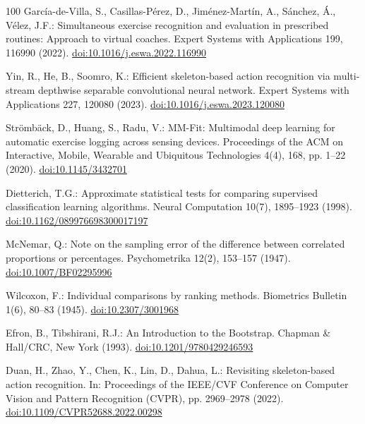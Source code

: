 \documentclass[runningheads]{llncs}
\begin{document}
\begin{thebibliography}{100}
Garc\'{i}a-de-Villa, S., Casillas-P\'{e}rez, D., Jim\'{e}nez-Mart\'{i}n, A., S\'{a}nchez, \'{A}., V\'{e}lez, J.F.: Simultaneous exercise recognition and evaluation in prescribed routines: Approach to virtual coaches. Expert Systems with Applications 199, 116990 (2022). \href{https://doi.org/10.1016/j.eswa.2022.116990}{doi:10.1016/j.eswa.2022.116990}

Yin, R., He, B., Soomro, K.: Efficient skeleton-based action recognition via multi-stream depthwise separable convolutional neural network. Expert Systems with Applications 227, 120080 (2023). \href{https://doi.org/10.1016/j.eswa.2023.120080}{doi:10.1016/j.eswa.2023.120080}

Str\"{o}mb\"{a}ck, D., Huang, S., Radu, V.: MM-Fit: Multimodal deep learning for automatic exercise logging across sensing devices. Proceedings of the ACM on Interactive, Mobile, Wearable and Ubiquitous Technologies 4(4), 168, pp. 1--22 (2020). \href{https://doi.org/10.1145/3432701}{doi:10.1145/3432701}

Dietterich, T.G.: Approximate statistical tests for comparing supervised classification learning algorithms. Neural Computation 10(7), 1895--1923 (1998). \href{https://doi.org/10.1162/089976698300017197}{doi:10.1162/089976698300017197}

McNemar, Q.: Note on the sampling error of the difference between correlated proportions or percentages. Psychometrika 12(2), 153--157 (1947). \href{https://doi.org/10.1007/BF02295996}{doi:10.1007/BF02295996}

Wilcoxon, F.: Individual comparisons by ranking methods. Biometrics Bulletin 1(6), 80--83 (1945). \href{https://doi.org/10.2307/3001968}{doi:10.2307/3001968}

Efron, B., Tibshirani, R.J.: An Introduction to the Bootstrap. Chapman \& Hall/CRC, New York (1993). \href{https://doi.org/10.1201/9780429246593}{doi:10.1201/9780429246593}

Duan, H., Zhao, Y., Chen, K., Lin, D., Dahua, L.: Revisiting skeleton-based action recognition. In: Proceedings of the IEEE/CVF Conference on Computer Vision and Pattern Recognition (CVPR), pp. 2969--2978 (2022). \href{https://doi.org/10.1109/CVPR52688.2022.00298}{doi:10.1109/CVPR52688.2022.00298}

\end{thebibliography}
\end{document}

